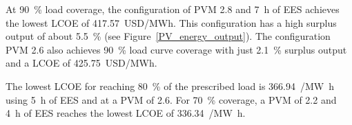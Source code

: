 
At \SI{90}{\percent} load coverage, the configuration of PVM \num{2.8} and \SI{7}{h} of EES achieves the lowest LCOE of \SI{417.57}{USD/MWh}. This configuration has a high surplus output of about \SI{5.5}{\percent} (see Figure~\ref{PV_energy_output}). The configuration PVM \num{2.6} also achieves \SI{90}{\percent} load curve coverage with just \SI{2.1}{\percent} surplus output and a LCOE of \SI{425.75}{USD/MWh}.


The lowest LCOE for reaching \SI{80}{\percent} of the prescribed load is \SI{366.94}{\usd/\mega\watt\hour} using \SI{5}{h} of EES and at a PVM of \num{2.6}. For \SI{70}{\percent} coverage, a PVM of \num{2.2} and \SI{4}{h} of EES reaches the lowest LCOE of \SI{336.34}{\usd/\mega\watt\hour}.